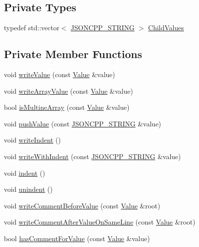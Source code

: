 \subsection*{Private Types}
\begin{DoxyCompactItemize}
\item 
typedef std\+::vector$<$ \hyperlink{json_8h_a1e723f95759de062585bc4a8fd3fa4be}{J\+S\+O\+N\+C\+P\+P\+\_\+\+S\+T\+R\+I\+NG} $>$ \hyperlink{class_json_1_1_styled_stream_writer_a259bf9d99847b2ea64ec9c6dd441944e}{Child\+Values}
\end{DoxyCompactItemize}
\subsection*{Private Member Functions}
\begin{DoxyCompactItemize}
\item 
void \hyperlink{class_json_1_1_styled_stream_writer_a4359250e09273fa0144021684be001ae}{write\+Value} (const \hyperlink{class_json_1_1_value}{Value} \&value)
\item 
void \hyperlink{class_json_1_1_styled_stream_writer_a606f2ddd58093c9b019d452c1b6f09fe}{write\+Array\+Value} (const \hyperlink{class_json_1_1_value}{Value} \&value)
\item 
bool \hyperlink{class_json_1_1_styled_stream_writer_a88f4d342cf25c73aabf77c1b8ba01e44}{is\+Multine\+Array} (const \hyperlink{class_json_1_1_value}{Value} \&value)
\item 
void \hyperlink{class_json_1_1_styled_stream_writer_a9adb47185695f07b1979d8f4c5347592}{push\+Value} (const \hyperlink{json_8h_a1e723f95759de062585bc4a8fd3fa4be}{J\+S\+O\+N\+C\+P\+P\+\_\+\+S\+T\+R\+I\+NG} \&value)
\item 
void \hyperlink{class_json_1_1_styled_stream_writer_a5a52fa5b406f1580a61dde3b5638e76d}{write\+Indent} ()
\item 
void \hyperlink{class_json_1_1_styled_stream_writer_a4e64789373b359c9b7a7244509b918fc}{write\+With\+Indent} (const \hyperlink{json_8h_a1e723f95759de062585bc4a8fd3fa4be}{J\+S\+O\+N\+C\+P\+P\+\_\+\+S\+T\+R\+I\+NG} \&value)
\item 
void \hyperlink{class_json_1_1_styled_stream_writer_ab49409578422aa73b060e3492dd6c72a}{indent} ()
\item 
void \hyperlink{class_json_1_1_styled_stream_writer_a74d8fb9beecd29759d7b79f430386358}{unindent} ()
\item 
void \hyperlink{class_json_1_1_styled_stream_writer_a79c3c2b320475035c47b2db484a3e434}{write\+Comment\+Before\+Value} (const \hyperlink{class_json_1_1_value}{Value} \&root)
\item 
void \hyperlink{class_json_1_1_styled_stream_writer_ad2ca860e317ca91d6b2932535b4ce9c7}{write\+Comment\+After\+Value\+On\+Same\+Line} (const \hyperlink{class_json_1_1_value}{Value} \&root)
\item 
bool \hyperlink{class_json_1_1_styled_stream_writer_ad2892f57171919fa4f8a5ae5574755cf}{has\+Comment\+For\+Value} (const \hyperlink{class_json_1_1_value}{Value} \&value)
\end{DoxyCompactItemize}
